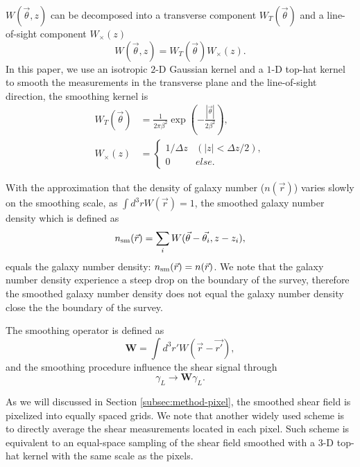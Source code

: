 \documentclass[twocolumn]{aastex62}
\begin{document}
$W(\vec{\theta},z)$ can be decomposed into a transverse component $W_T(\vec{\theta})$ and a line-of-sight component
$W_\times(z)$
\begin{equation}
W(\vec{\theta},z)=W_T(\vec{\theta}) W_\times (z).
\end{equation}
In this paper, we use an isotropic $2$-D Gaussian kernel and a $1$-D top-hat kernel to smooth the measurements in the 
transverse plane and the line-of-sight direction, the smoothing kernel is 
\begin{equation}
\begin{split}
W_T(\vec{\theta}) &=\frac{1}{2\pi\beta^2}\exp(-\frac{|\vec{\theta}|}{2\beta^2}),\\
W_\times (z) &=
\begin{cases}
1/\Delta z& (|z|<\Delta z/2),\\
0& else.
\end{cases}
\end{split}
\end{equation}

With the approximation that the density of galaxy number ($n(\vec{r})$) varies slowly on the smoothing scale, 
as $\int d^3r W(\vec{r})=1$, the smoothed galaxy number density which is defined as
\begin{equation}\label{eq-numDesSmooth}
n_{\rm{sm}}(\vec{r})=\sum_i W(\vec{\theta}-\vec{\theta_i},z-z_i),
\end{equation}
equals the galaxy number density: $n_{\rm{sm}}(\vec{r})=n(\vec{r})$.
We note that the galaxy number density experience a steep drop on the boundary of the survey, therefore the 
smoothed galaxy number density does not equal the galaxy number density close the the boundary of the survey.

The smoothing operator is defined as
\begin{equation}
\mathbf{W} = \int d^3 r' W(\vec{r}-\vec{r'}),
\end{equation}
and the smoothing procedure influence the shear signal through
\begin{equation}
\gamma_L \rightarrow \mathbf{W} \gamma_L.
\end{equation}

As we will discussed in Section \ref{subsec:method-pixel}, the smoothed shear field is pixelized into equally spaced
grids. We note that another widely used scheme is to directly average the shear measurements located in each pixel. 
Such scheme is equivalent to an equal-space sampling of the shear field smoothed with a $3$-D top-hat kernel with the 
same scale as the pixels.
\end{document}
